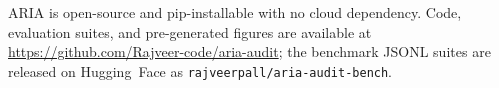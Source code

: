 \documentclass{article}
\begin{document}
ARIA is open-source and pip-installable with no cloud dependency.
Code, evaluation suites, and pre-generated figures are available at
\url{https://github.com/Rajveer-code/aria-audit}; the benchmark JSONL
suites are released on Hugging~Face as
\texttt{rajveerpall/aria-audit-bench}.


\end{document}
